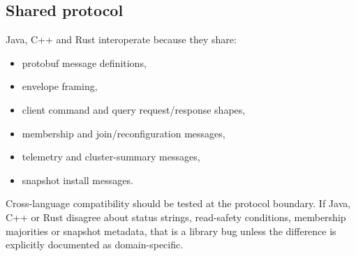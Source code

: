 \subsection{Shared protocol}

Java, C++ and Rust interoperate because they share:

\begin{itemize}
\item protobuf message definitions,
\item envelope framing,
\item client command and query request/response shapes,
\item membership and join/reconfiguration messages,
\item telemetry and cluster-summary messages,
\item snapshot install messages.
\end{itemize}

Cross-language compatibility should be tested at the protocol boundary. If Java,
C++ or Rust disagree about status strings, read-safety conditions, membership
majorities or snapshot metadata, that is a library bug unless the difference is
explicitly documented as domain-specific.
